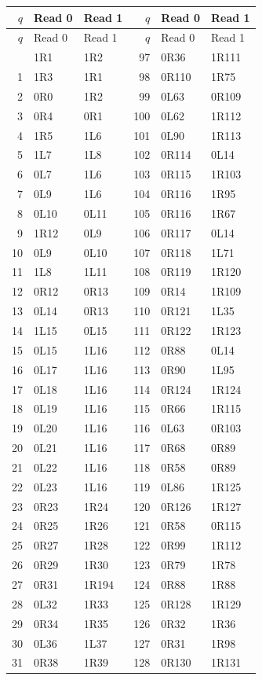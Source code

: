 \begingroup\small\ttfamily\renewcommand{\arraystretch}{0.96}
\begin{longtable}{rll@{\hspace{1.2cm}}rll}
\toprule
$q$ & Read 0 & Read 1 & $q$ & Read 0 & Read 1 \\
\midrule\endfirsthead
\toprule
$q$ & Read 0 & Read 1 & $q$ & Read 0 & Read 1 \\
\midrule\endhead
\bottomrule\endfoot
0&1R1&1R2&97&0R36&1R111\\
1&1R3&1R1&98&0R110&1R75\\
2&0R0&1R2&99&0L63&0R109\\
3&0R4&0R1&100&0L62&1R112\\
4&1R5&1L6&101&0L90&1R113\\
5&1L7&1L8&102&0R114&0L14\\
6&0L7&1L6&103&0R115&1R103\\
7&0L9&1L6&104&0R116&1R95\\
8&0L10&0L11&105&0R116&1R67\\
9&1R12&0L9&106&0R117&0L14\\
10&0L9&0L10&107&0R118&1L71\\
11&1L8&1L11&108&0R119&1R120\\
12&0R12&0R13&109&0R14&1R109\\
13&0L14&0R13&110&0R121&1L35\\
14&1L15&0L15&111&0R122&1R123\\
15&0L15&1L16&112&0R88&0L14\\
16&0L17&1L16&113&0R90&1L95\\
17&0L18&1L16&114&0R124&1R124\\
18&0L19&1L16&115&0R66&1R115\\
19&0L20&1L16&116&0L63&0R103\\
20&0L21&1L16&117&0R68&0R89\\
21&0L22&1L16&118&0R58&0R89\\
22&0L23&1L16&119&0L86&1R125\\
23&0R23&1R24&120&0R126&1R127\\
24&0R25&1R26&121&0R58&0R115\\
25&0R27&1R28&122&0R99&1R112\\
26&0R29&1R30&123&0R79&1R78\\
27&0R31&1R194&124&0R88&1R88\\
28&0L32&1R33&125&0R128&1R129\\
29&0R34&1R35&126&0R32&1R36\\
30&0L36&1L37&127&0R31&1R98\\
31&0R38&1R39&128&0R130&1R131\\

\end{longtable}
